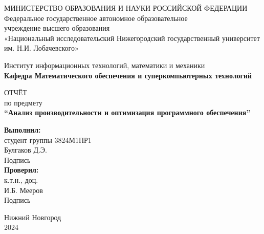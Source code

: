 \documentclass[12pt]{extarticle}
\title{}
\author{}
\date{}
\begin{document}
    \begin{titlepage}

        \begin{center}
            МИНИСТЕРСТВО ОБРАЗОВАНИЯ И НАУКИ РОССИЙСКОЙ ФЕДЕРАЦИИ \\
            Федеральное государственное автономное образовательное \\
            учреждение высшего образования \\
            «Национальный исследовательский Нижегородский государственный университет им. Н.И. Лобачевского»\\
        \end{center}

        \bigbreak

        \begin{center}
            Институт информационных технологий, математики и механики \\
            {\bfseries Кафедра Математического обеспечения и суперкомпьютерных технологий} \\
        \end{center}

        \vspace{2em}

        \begin{center}
            ОТЧЁТ \\ по предмету \\
            {\bfseries ``Анализ производительности и оптимизация программного
            обеспечения''}
        \end{center}

        \vspace{5em}

        \begin{flushright}
            {\bfseries Выполнил:} \\студент группы 3824М1ПР1\\Булгаков Д.Э.\\
            \hfill Подпись \hspace{5em} \newline \\
            {\bfseries Проверил:} \\к.т.н., доц.\\ И.Б. Мееров\\
            \hfill Подпись \hspace{5em} \newline \\
        \end{flushright}


        \vspace{\fill}

        \begin{center}
            Нижний Новгород\\2024
        \end{center}
    \end{titlepage}
\end{document}
